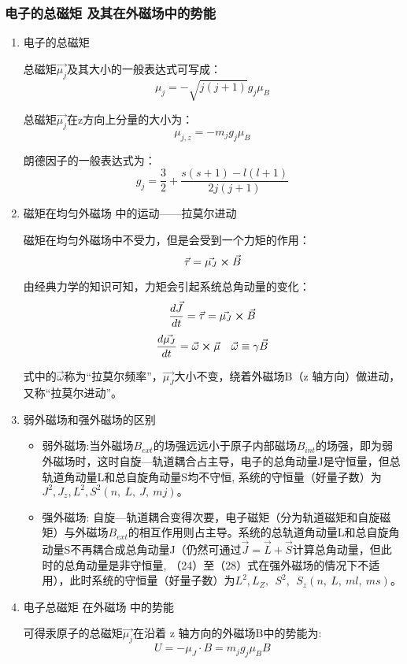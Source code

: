 \documentclass[dvipsnames, svgnames,a4paper,11pt]{article}
\begin{document}
	\subsubsection{电子的总磁矩 及其在外磁场中的势能}

		\begin{enumerate}
			\item 电子的总磁矩
			
				总磁矩$\vec{\mu_j}$及其大小的一般表达式可写成：
					\[
						\mu_j = -\sqrt{j(j+1)}g_j \mu_B
					\]

				总磁矩$\vec{\mu_j}$在z方向上分量的大小为：
					\[
						\mu_{j,z} = - m_j g_j \mu_B	
					\]

				朗德因子的一般表达式为：
					\[
						g_j=\frac{3}{2}+\frac{s\left(s+1\right)-l\left(l+1\right)}{2j\left(j+1\right)}	
					\]

			\item 磁矩在均匀外磁场 中的运动——拉莫尔进动
			
				磁矩在均匀外磁场中不受力，但是会受到一个力矩的作用：
				\[
					\vec{\tau} = \vec{\mu_J} \cross \vec{B}	
				\]

				由经典力学的知识可知，力矩会引起系统总角动量的变化：
				\[
					\frac{d \vec{J}}{d t} = \vec{\tau} = \vec{\mu_J} \cross \vec{B}
				\]
				\[
					\frac{d \vec{\mu_J}}{d t} = \vec{\omega} \cross \vec{\mu} \quad \vec{\omega} \equiv \gamma \vec{B}
				\]
				
				式中的$\vec{\omega}$称为“拉莫尔频率”，$\vec{\mu_J}$大小不变，绕着外磁场B（z 轴方向）做进动，又称“拉莫尔进动”。

			\item 弱外磁场和强外磁场的区别
			
				\begin{itemize}
					\item 弱外磁场:当外磁场$B_{ext}$的场强远远小于原子内部磁场$B_{int}$的场强，即为弱外磁场时，这时自旋—轨道耦合占主导，电子的总角动量J是守恒量，但总轨道角动量L和总自旋角动量S均不守恒, 系统的守恒量（好量子数）为$J^2,J_z,L^2,S^2\left(n,\ L,\ J,\ mj\right)。$
					\item 强外磁场: 自旋—轨道耦合变得次要，电子磁矩（分为轨道磁矩和自旋磁矩）与外磁场$B_{ext}$的相互作用则占主导。系统的总轨道角动量L和总自旋角动量S不再耦合成总角动量J（仍然可通过$\vec{J}=\vec{L}+\vec{S}$计算总角动量，但此时的总角动量是非守恒量, （24）至（28）式在强外磁场的情况下不适用），此时系统的守恒量（好量子数）为$L^2,L_Z,\ \ S^2,\ {\ S}_z\left(n,\ L,\ ml,\ ms\right)$。
				\end{itemize}
			
			\item 电子总磁矩 在外磁场 中的势能
			
				可得汞原子的总磁矩$\vec{\mu_j}$在沿着 z 轴方向的外磁场B中的势能为:
				\[
					U=-\mu_J \cdot B=m_jg_j\mu_B B	
				\]


		\end{enumerate}
\end{document}
